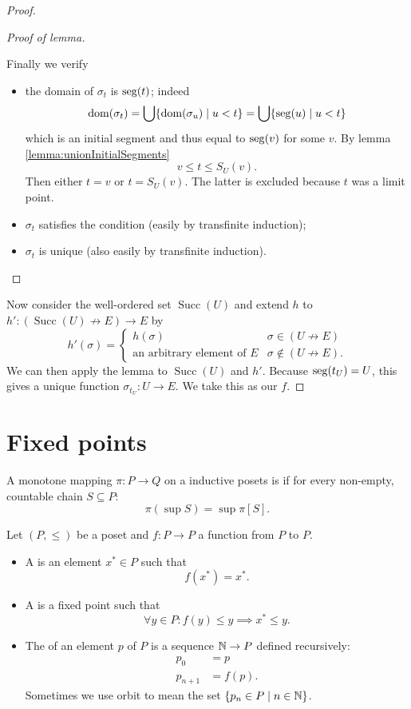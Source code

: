 \begin{proof}
\begin{proof}[Proof of lemma]
\begin{itemize}[leftmargin=2.5cm]
Finally we verify
\begin{itemize}
\item the domain of $\sigma_t$ is $\operatorname{seg}(t)$; indeed
\[ \operatorname{dom}(\sigma_t) = \bigcup\{\operatorname{dom}(\sigma_u)\;|\; u< t \} = \bigcup\{ \operatorname{seg}(u)\;|\; u<t \} \]
which is an initial segment and thus equal to $\operatorname{seg}(v)$ for some $v$. By lemma \ref{lemma:unionInitialSegments}
\[ v\leq t \leq S_U(v). \]
Then either $t=v$ or $t=S_U(v)$. The latter is excluded because $t$ was a limit point.
\item $\sigma_t$ satisfies the condition (easily by transfinite induction);
\item $\sigma_t$ is unique (also easily by transfinite induction).
\end{itemize}
\end{itemize}
\end{proof}

Now consider the well-ordered set $\operatorname{Succ}(U)$ and extend $h$ to $h': (\operatorname{Succ}(U)\not\to E) \to E$ by
\[ h'(\sigma) = \begin{cases}
h(\sigma) & \sigma\in (U\not\to E) \\
\text{an arbitrary element of $E$} & \sigma \notin (U\not\to E).
\end{cases} \]
We can then apply the lemma to $\operatorname{Succ}(U)$ and $h'$. Because $\operatorname{seg}(t_U) = U$, this gives a unique function $\sigma_{t_U}: U\to E$. We take this as our $f$.
\end{proof}


\chapter{Fixed points}

\begin{definition}
A monotone mapping $\pi : P \to Q$ on a inductive posets
 is  if for every non-empty, countable chain $S\subseteq P$:
 \[ \pi(\sup S) = \sup\pi[S]. \]
\end{definition}

\begin{definition}
Let $(P,\leq)$ be a poset and $f: P\to P$ a function from $P$ to $P$.
\begin{itemize}
\item A  is an element $x^*\in P$ such that
\[ f(x^*) = x^*. \]
\item A  is a fixed point such that
\[ \forall y\in P: f(y)\leq y \implies x^* \leq y. \]
\item The  of an element $p$ of $P$ is a sequence $\mathbb{N}\to P$ defined recursively:
\begin{align*}
p_0 &= p \\
p_{n+1} &= f(p).
\end{align*}
Sometimes we use orbit to mean the set $\{p_n\in P\;|\; n\in \mathbb{N}\}$.
\end{itemize}
\end{definition}

